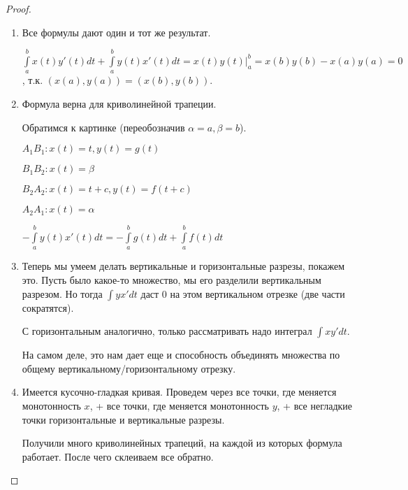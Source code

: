     \begin{proof}

        \begin{enumerate}

            \item Все формулы дают один и тот же результат.

            $\int\limits_a^b x(t)y'(t) dt + \int\limits_a^b y(t)x'(t) dt = x(t)y(t) \bigg|_a^b = x(b)y(b) - x(a)y(a) = 0$, т.к. $(x(a), y(a)) = (x(b), y(b))$.

            \item Формула верна для криволинейной трапеции.

            Обратимся к картинке (переобозначив $\alpha = a, \beta = b$).

            $A_1B_1 \colon x(t) = t, y(t) = g(t)$

            $B_1B_2 \colon x(t) = \beta$

            $B_2A_2 \colon x(t) = t + c, y(t) = f(t + c)$

            $A_2A_1 \colon x(t) = \alpha$

            $-\int\limits_a^b y(t)x'(t) dt = -\int\limits_a^b g(t) dt + \int\limits_a^b f(t) dt$

            \item Теперь мы умеем делать вертикальные и горизонтальные разрезы, покажем это. 
            Пусть было какое-то множество, мы его разделили вертикальным разрезом. 
            Но тогда $\int y x' dt$ даст 0 на этом вертикальном отрезке (две части сократятся).

            С горизонтальным аналогично, только рассматривать надо интеграл $\int x y' dt$.

            На самом деле, это нам дает еще и способность объединять множества по общему вертикальному/горизонтальному отрезку.

            \item Имеется кусочно-гладкая кривая. 
            Проведем через все точки, где меняется монотонность $x$, + все точки, где меняется монотонность $y$, + все негладкие точки горизонтальные и вертикальные разрезы.
            
            Получили много криволинейных трапеций, на каждой из которых формула работает. После чего склеиваем все обратно.

        \end{enumerate}

    \end{proof}

